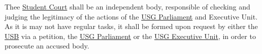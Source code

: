 \protect\label{StudentCourtDef}
Thee \protect\hyperref[StudentCourtDef]{Student Court} shall be an independent body, responsible of checking and judging the legitimacy of the actions of the \protect\hyperref[USGParliamentDef]{USG Parliament} and Executive Unit. As it is may not have regular tasks, it shall be formed upon request by either the \protect\hyperref[studentbody]{USB} via a petition, the \protect\hyperref[USGParliamentDef]{USG Parliament} or the \protect\hyperref[USGexecutiveUnitDef]{USG Executive Unit}, in order to prosecute an accused body.


